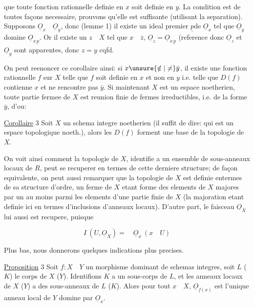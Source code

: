 
que toute fonction rationnelle definie en \(x\) soit definie en \(y\).  La condition est de toutes façons necessaire, prouvons qu'elle est suffisante (utilisant la separation). Supposons \(\underline O_x\quad\underline O_y\), donc (lemme 1) il existe un ideal premier \(\underline p\)de \(\underline O_x\) tel que \(\underline O_y\) domine \(\underline O_{x\,\underline p}\). Or il existe un \(z\quad X\) tel que \(x\quad\bar z\), \(\underline O_z=\underline O_{x\,\underline p}\) (reference
donc \(\underline O_z\) et \(\underline O_y\) sont apparentes, donc \(z=y\) cqfd.

On peut reenoncer ce corollaire ainsi: si \(x\unsure{\notin|\ne}\bar y\), il existe une fonction rationnelle \(f\) sur \(X\) telle que \(f\) soit definie en \(x\) et non en \(y\) i.e. telle que \(D(f)\) contienne \(x\) et ne rencontre pas \(\bar y\). Si maintenant \(X\) est un espace noetherien, toute partie fermee de \(X\) est reunion finie de fermes irreductibles, i.e. de la forme \(\bar y\), d'ou:

\uline{Corollaire} 3 Soit \(X\) un schema integre noetherien (il suffit de dire: qui est un espace topologique noeth.), alors les \(D(f)\) forment une base de la topologie de \(X\).

On voit ainsi comment la topologie de \(X\), identifie a un ensemble de sous-anneaux locaux de \(R\), peut se recuperer en termes de cette derniere structure; de façon equivalente, on peut aussi remarquer que la topologie de \(X\) est definie entermes de sa structure d'ordre, un ferme de \(X\) etant forme des elements de \(X\) majores par un au moins parmi les elements d'une partie finie de \(X\) (la majoration etant definie  ici en termes d'inclusions  d'anneaux locaux). D'autre part, le faisceau \(\underline O_X\) lui aussi est recupere, puisque

\[
I\ (U,\underline O_X)=\quad\underline O_x\ (x\quad U)
\]

Plus bas, nous donnerons quelques indications plus precises.

\uline{Proposition} 3 Soit \(f:X\quad Y\) un morphisme dominant de schemas integres,  soit \(L\) (\(K\)) le corps de \(X\) (\(Y\)). Identifions \(K\) a un sous-corps de \(L\), et les anneaux locaux de \(X\) (\(Y\)) a des sous-anneaux de \(L\) (\(K\)). Alors pour tout \(x\quad X\), \(\underline O_{f(x)}\) est l'unique anneau local de \(Y\) domine par \(\underline O_x\).

